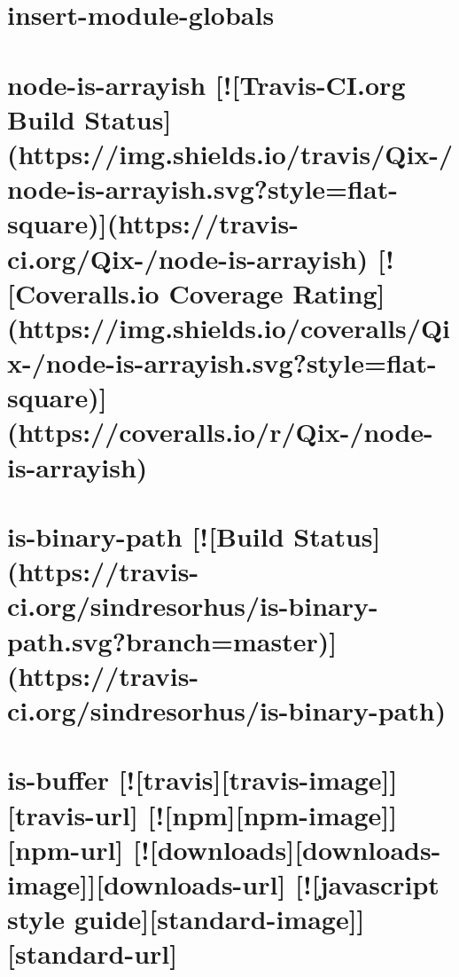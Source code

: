 \documentclass[twoside]{book}
\newcommand{\+}{\discretionary{\mbox{\scriptsize$\hookleftarrow$}}{}{}}
\begin{document}
\chapter{insert-\/module-\/globals}
\label{md_dsmacc_examples_DRmerge_node_modules_insert-module-globals_readme}

\chapter{node-\/is-\/arrayish \mbox{[}!\mbox{[}Travis-\/\+CI.org Build Status\mbox{]}(https\+://img.shields.\+io/travis/\+Qix-\//node-\/is-\/arrayish.svg?style=flat-\/square)\mbox{]}(https\+://travis-\/ci.org/\+Qix-\//node-\/is-\/arrayish) \mbox{[}!\mbox{[}Coveralls.\+io Coverage Rating\mbox{]}(https\+://img.shields.\+io/coveralls/\+Qix-\//node-\/is-\/arrayish.svg?style=flat-\/square)\mbox{]}(https\+://coveralls.io/r/\+Qix-\//node-\/is-\/arrayish)}
\label{md_dsmacc_examples_DRmerge_node_modules_is-arrayish_README}

\chapter{is-\/binary-\/path \mbox{[}!\mbox{[}Build Status\mbox{]}(https\+://travis-\/ci.org/sindresorhus/is-\/binary-\/path.svg?branch=master)\mbox{]}(https\+://travis-\/ci.org/sindresorhus/is-\/binary-\/path)}
\label{md_dsmacc_examples_DRmerge_node_modules_is-binary-path_readme}

\chapter{is-\/buffer \mbox{[}!\mbox{[}travis\mbox{]}\mbox{[}travis-\/image\mbox{]}\mbox{]}\mbox{[}travis-\/url\mbox{]} \mbox{[}!\mbox{[}npm\mbox{]}\mbox{[}npm-\/image\mbox{]}\mbox{]}\mbox{[}npm-\/url\mbox{]} \mbox{[}!\mbox{[}downloads\mbox{]}\mbox{[}downloads-\/image\mbox{]}\mbox{]}\mbox{[}downloads-\/url\mbox{]} \mbox{[}!\mbox{[}javascript style guide\mbox{]}\mbox{[}standard-\/image\mbox{]}\mbox{]}\mbox{[}standard-\/url\mbox{]}}
\label{md_dsmacc_examples_DRmerge_node_modules_is-buffer_README}

\end{document}
